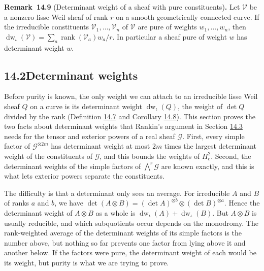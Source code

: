 \documentclass[11pt]{article}
\newenvironment{bpstatement}[2]{\par\addvspace{0.6\baselineskip}\noindent\textbf{#1}#2\textbf{.}\enspace\ignorespaces}
  {\par\addvspace{0.4\baselineskip}}
\begin{document}
\label{bp30}%
\begin{bpstatement}{Remark~14.9}{ (Determinant weight of a sheaf with pure constituents)}
Let \(\mathcal V\) be a nonzero lisse Weil sheaf of rank \(r\) on a smooth geometrically connected curve. If the irreducible constituents \(\mathcal V_1,\dots,\mathcal V_n\) of \(\mathcal V\) are pure of weights \(w_1,\dots,w_n\), then \(\operatorname{dw}_\iota(\mathcal V)=\sum_a\operatorname{rank}(\mathcal V_a)w_a/r\). In particular a sheaf pure of weight \(w\) has determinant weight \(w\).
\end{bpstatement}



\subsection*{\texorpdfstring{14.2\quad Determinant weights}{14.2 Determinant weights}}
\label{bp31}%
\label{bp32}%
Before purity is known, the only weight we can attach to an irreducible lisse Weil sheaf \(Q\) on a curve is its determinant weight \(\operatorname{dw}_\iota(Q)\), the weight of \(\det Q\) divided by the rank (Definition \hyperref[bp26]{14.7} and Corollary \hyperref[bp27]{14.8}). This section proves the two facts about determinant weights that Rankin's argument in Section \hyperref[bp64]{14.3} needs for the tensor and exterior powers of a real sheaf \(\mathcal G\). First, every simple factor of \(\mathcal G^{\otimes2m}\) has determinant weight at most \(2m\) times the largest determinant weight of the constituents of \(\mathcal G\), and this bounds the weights of \(H^2_c\). Second, the determinant weights of the simple factors of \(\bigwedge^r\mathcal G\) are known exactly, and this is what lets exterior powers separate the constituents.

The difficulty is that a determinant only sees an average. For irreducible \(A\) and \(B\) of ranks \(a\) and \(b\), we have \(\det(A\otimes B)=(\det A)^{\otimes b}\otimes(\det B)^{\otimes a}\). Hence the determinant weight of \(A\otimes B\) as a whole is \(\operatorname{dw}_\iota(A)+\operatorname{dw}_\iota(B)\). But \(A\otimes B\) is usually reducible, and which subquotients occur depends on the monodromy. The rank-weighted average of the determinant weights of its simple factors is the number above, but nothing so far prevents one factor from lying above it and another below. If the factors were pure, the determinant weight of each would be its weight, but purity is what we are trying to prove.
\end{document}

